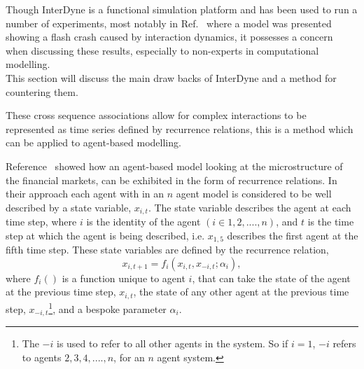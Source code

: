 \documentclass{article}
\begin{document}
Though InterDyne is a functional simulation platform and has been used to run a number of experiments, most notably in Ref.~\cite{DynamicCoupling_Chris} where a model was presented showing a flash crash caused by interaction dynamics, it possesses a concern when discussing these results, especially to non-experts in computational modelling.\\
This section will discuss the main draw backs of InterDyne and a method for countering them.  











These cross sequence associations allow for complex interactions to be represented as time series defined by recurrence relations, this is a method which can be applied to agent-based modelling.

Reference~\cite{econmistsnoabm} showed how an agent-based model looking at the microstructure of the financial markets, can be exhibited in the form of recurrence relations. In their approach each agent with in an $n$ agent model is considered to be well described by a state variable, $x_{i, t}$. The state variable describes the agent at each time step, where $i$ is the identity of the agent $(i \in 1,2,....,n)$, and $t$ is the time step at which the agent is being described, i.e. $x_{1,5}$ describes the first agent at the fifth time step. These state variables are defined by the recurrence relation,     
\begin{equation} \label{eq:notimedelayrecur}
x_{i, t+1} = f_{i}(x_{i, t}, x_{-i,t}; \alpha_{i}),
\end{equation}
where $f_{i}()$ is a function unique to agent $i$, that can take the state of the agent at the previous time step, $x_{i, t}$, the state of any other agent at the previous time step, $x_{-i, t}$\footnote{The $-i$ is used to refer to all other agents in the system. So if $i=1$, $-i$ refers to agents $2,3,4,....,n$, for an $n$ agent system.}, and a bespoke parameter $\alpha_{i}$.
\end{document}
